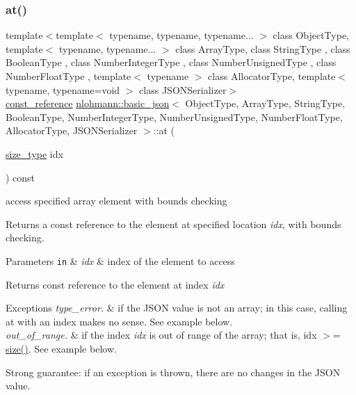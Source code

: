 \subsubsection{\texorpdfstring{at()}{at()}\hspace{0.1cm}{\footnotesize\ttfamily [2/6]}}
{\footnotesize\ttfamily template$<$template$<$ typename, typename, typename... $>$ class Object\+Type, template$<$ typename, typename... $>$ class Array\+Type, class String\+Type , class Boolean\+Type , class Number\+Integer\+Type , class Number\+Unsigned\+Type , class Number\+Float\+Type , template$<$ typename $>$ class Allocator\+Type, template$<$ typename, typename=void $>$ class J\+S\+O\+N\+Serializer$>$ \\
\hyperlink{classnlohmann_1_1basic__json_a4057c5425f4faacfe39a8046871786ca}{const\+\_\+reference} \hyperlink{classnlohmann_1_1basic__json}{nlohmann\+::basic\+\_\+json}$<$ Object\+Type, Array\+Type, String\+Type, Boolean\+Type, Number\+Integer\+Type, Number\+Unsigned\+Type, Number\+Float\+Type, Allocator\+Type, J\+S\+O\+N\+Serializer $>$\+::at (\begin{DoxyParamCaption}\item[{\hyperlink{classnlohmann_1_1basic__json_a39f2cd0b58106097e0e67bf185cc519b}{size\+\_\+type}}]{idx }\end{DoxyParamCaption}) const\hspace{0.3cm}{\ttfamily [inline]}}



access specified array element with bounds checking 

Returns a const reference to the element at specified location {\itshape idx}, with bounds checking.


\begin{DoxyParams}[1]{Parameters}
\mbox{\tt in}  & {\em idx} & index of the element to access\\
\hline
\end{DoxyParams}
\begin{DoxyReturn}{Returns}
const reference to the element at index {\itshape idx} 
\end{DoxyReturn}

\begin{DoxyExceptions}{Exceptions}
{\em type\+\_\+error.} & if the J\+S\+ON value is not an array; in this case, calling {\ttfamily at} with an index makes no sense. See example below. \\
\hline
{\em out\+\_\+of\+\_\+range.} & if the index {\itshape idx} is out of range of the array; that is, {\ttfamily idx $>$= \hyperlink{classnlohmann_1_1basic__json_a25e27ad0c6d53c01871c5485e1f75b96}{size()}}. See example below.\\
\hline
\end{DoxyExceptions}
Strong guarantee\+: if an exception is thrown, there are no changes in the J\+S\+ON value.


